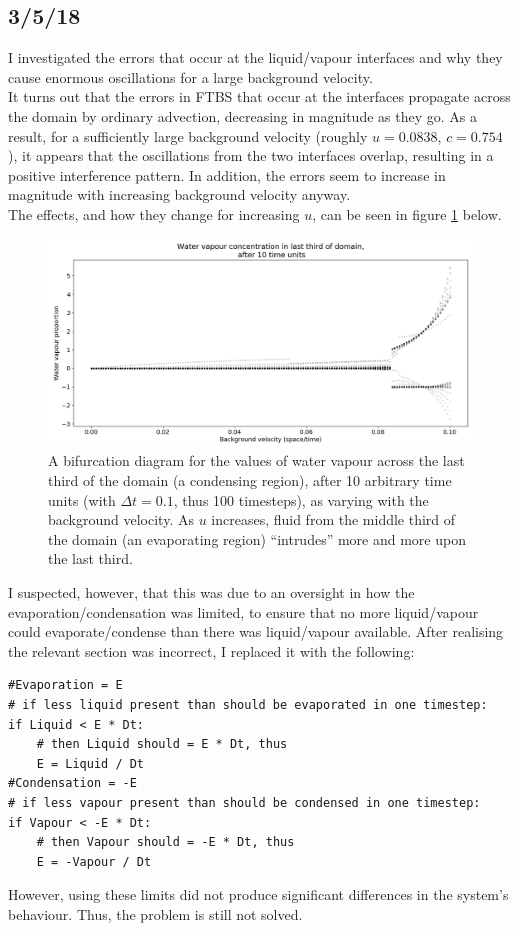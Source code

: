 \documentclass[11pt]{article}
\begin{document}
\subsection{3/5/18}
I investigated the errors that occur at the liquid/vapour interfaces and why they cause enormous oscillations for a large background velocity.\\
It turns out that the errors in FTBS that occur at the interfaces propagate across the domain by ordinary advection, decreasing in magnitude as they go. As a result, for a sufficiently large background velocity (roughly $u=0.0838$, $c=0.754$), it appears that the oscillations from the two interfaces overlap, resulting in a positive interference pattern. In addition, the errors seem to increase in magnitude with increasing background velocity anyway. \\
The effects, and how they change for increasing $u$, can be seen in figure \ref{fig:eighth} below.
\begin{figure}[H]
\centering
\includegraphics[width=\textwidth]{eighth}
\caption{A bifurcation diagram for the values of water vapour across the last third of the domain (a condensing region), after 10 arbitrary time units (with $\Delta t=0.1$, thus 100 timesteps), as varying with the background velocity. As $u$ increases, fluid from the middle third of the domain (an evaporating region) ``intrudes'' more and more upon the last third.}
\label{fig:eighth}
\end{figure}
\noindent I suspected, however, that this was due to an oversight in how the evaporation/condensation was limited, to ensure that no more liquid/vapour could evaporate/condense than there was liquid/vapour available. After realising the relevant section was incorrect, I replaced it with the following:
\begin{lstlisting}
#Evaporation = E
# if less liquid present than should be evaporated in one timestep:
if Liquid < E * Dt:
	# then Liquid should = E * Dt, thus
	E = Liquid / Dt
#Condensation = -E
# if less vapour present than should be condensed in one timestep:
if Vapour < -E * Dt:
	# then Vapour should = -E * Dt, thus
	E = -Vapour / Dt
\end{lstlisting}
However, using these limits did not produce significant differences in the system's behaviour. Thus, the problem is still not solved.
\end{document}
